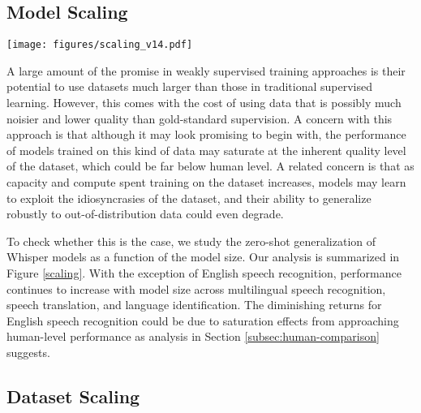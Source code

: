 \subsection{Model Scaling}

\begin{figure*}[t]
\begin{center}
\centerline{\texttt{[image: figures/scaling\_v14.pdf]}}
\caption{\textbf{Zero-shot Whisper performance scales reliably across tasks and languages with increasing model size.} Lightly shaded lines represent individual datasets or languages, showing that performance is more varied than the smooth trends in aggregate performance. Large V2 distinguished with a dashed orange line since it includes several changes that are not present for the smaller models in this analysis.}
\label{scaling}
\end{center}
\vspace{-1em}
\end{figure*}

A large amount of the promise in weakly supervised training approaches is their potential to use datasets much larger than those in traditional supervised learning. However, this comes with the cost of using data that is possibly much noisier and lower quality than gold-standard supervision. A concern with this approach is that although it may look promising to begin with, the performance of models trained on this kind of data may saturate at the inherent quality level of the dataset, which could be far below human level. A related concern is that as capacity and compute spent training on the dataset increases, models may learn to exploit the idiosyncrasies of the dataset, and their ability to generalize robustly to out-of-distribution data could even degrade. 

To check whether this is the case, we study the zero-shot generalization of Whisper models as a function of the model size. Our analysis is summarized in Figure \ref{scaling}. With the exception of English speech recognition, performance continues to increase with model size across multilingual speech recognition, speech translation, and language identification. The diminishing returns for English speech recognition could be due to saturation effects from approaching human-level performance as analysis in Section \ref{subsec:human-comparison} suggests.

\subsection{Dataset Scaling}

